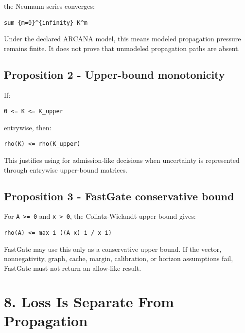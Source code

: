 \documentclass[
  american,
  a4paper,
  10pt]{article}
\begin{document}
the Neumann series converges:

\begin{Verbatim}[breaklines=true,breakanywhere=true,fontsize=\small]
sum_{m=0}^{infinity} K^m
\end{Verbatim}

Under the declared ARCANA model, this means modeled propagation pressure remains finite.
It does not prove that unmodeled propagation paths are absent.

\subsection{Proposition 2 - Upper-bound
monotonicity}\label{proposition-2---upper-bound-monotonicity}

If:

\begin{Verbatim}[breaklines=true,breakanywhere=true,fontsize=\small]
0 <= K <= K_upper
\end{Verbatim}

entrywise, then:

\begin{Verbatim}[breaklines=true,breakanywhere=true,fontsize=\small]
rho(K) <= rho(K_upper)
\end{Verbatim}

This justifies using  for admission-like decisions when uncertainty
is represented through entrywise upper-bound matrices.

\subsection{Proposition 3 - FastGate conservative
bound}\label{proposition-3---fastgate-conservative-bound}

For \texttt{A\ \textgreater{}=\ 0} and \texttt{x\ \textgreater{}\ 0}, the
Collatz-Wielandt upper bound gives:

\begin{Verbatim}[breaklines=true,breakanywhere=true,fontsize=\small]
rho(A) <= max_i ((A x)_i / x_i)
\end{Verbatim}

FastGate may use this only as a conservative upper bound. If the vector, nonnegativity,
graph, cache, margin, calibration, or horizon assumptions fail, FastGate must not return
an allow-like result.

\section{8. Loss Is Separate From
Propagation}\label{8-loss-is-separate-from-propagation}
\end{document}
